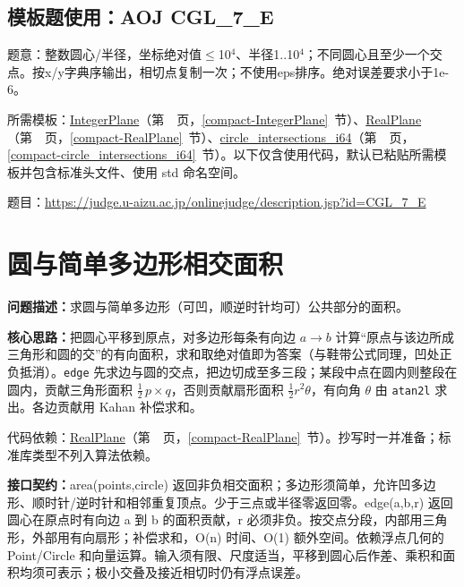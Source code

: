 

\Needspace{331pt}

\subsection*{模板题使用：AOJ CGL\_7\_E}

\label{usage-example-152}

题意：整数圆心/半径，坐标绝对值$\le$10$^{4}$、半径1..10$^{4}$；不同圆心且至少一个交点。按x/y字典序输出，相切点复制一次；不使用eps排序。绝对误差要求小于1e-6。

所需模板：\hyperref[compact-IntegerPlane]{IntegerPlane}（第~\pageref{compact-IntegerPlane}~页，\ref{compact-IntegerPlane}~节）、\hyperref[compact-RealPlane]{RealPlane}（第~\pageref{compact-RealPlane}~页，\ref{compact-RealPlane}~节）、\hyperref[compact-circle_intersections_i64]{circle\_\allowbreak{}intersections\_\allowbreak{}i64}（第~\pageref{compact-circle_intersections_i64}~页，\ref{compact-circle_intersections_i64}~节）。以下仅含使用代码，默认已粘贴所需模板并包含标准头文件、使用 std 命名空间。

题目：\url{https://judge.u-aizu.ac.jp/onlinejudge/description.jsp?id=CGL_7_E}



\Needspace{510pt}

\section{圆与简单多边形相交面积}\label{compact-CirclePolygon}

\noindent\textbf{问题描述：}\allowbreak 求圆与简单多边形（可凹，顺逆时针均可）公共部分的面积。

\textbf{核心思路：}\allowbreak 把圆心平移到原点，对多边形每条有向边 $a\to b$ 计算“原点与该边所成三角形和圆的交”的有向面积，求和取绝对值即为答案（与鞋带公式同理，凹处正负抵消）。\texttt{edge} 先求边与圆的交点，把边切成至多三段；某段中点在圆内则整段在圆内，贡献三角形面积 $\frac12\,p\times q$，否则贡献扇形面积 $\frac12r^2\theta$，有向角 $\theta$ 由 \texttt{atan2l} 求出。各边贡献用 Kahan 补偿求和。

代码依赖：\hyperref[compact-RealPlane]{RealPlane}（第~\pageref{compact-RealPlane}~页，\ref{compact-RealPlane}~节）。抄写时一并准备；标准库类型不列入算法依赖。

{\sloppy{}\noindent\textbf{接口契约：}area(points,circle) 返回非负相交面积；多边形须简单，允许凹多边形、顺时针/逆时针和相邻重复顶点。少于三点或半径零返回零。edge(a,b,r) 返回圆心在原点时有向边 a 到 b 的面积贡献，r 必须非负。按交点分段，内部用三角形，外部用有向扇形；补偿求和，O(n) 时间、O(1) 额外空间。依赖浮点几何的 Point/Circle 和向量运算。输入须有限、尺度适当，平移到圆心后作差、乘积和面积均须可表示；极小交叠及接近相切时仍有浮点误差。\par}

